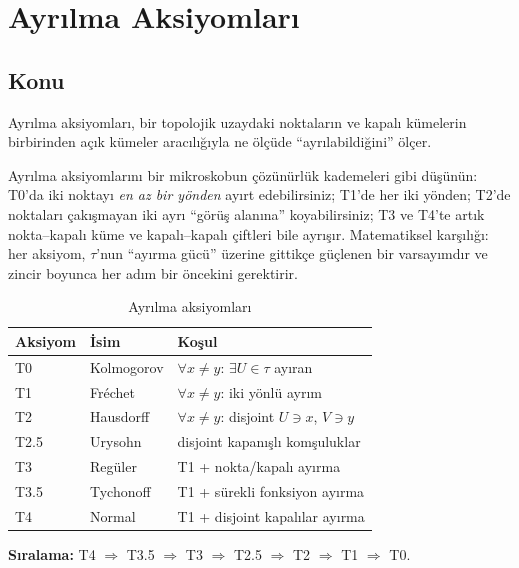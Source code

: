 \chapter{Ayrılma Aksiyomları}
\label{ch:separation}

\section{Konu}

Ayrılma aksiyomları, bir topolojik uzaydaki noktaların ve kapalı kümelerin birbirinden
açık kümeler aracılığıyla ne ölçüde ``ayrılabildiğini'' ölçer.

\begin{sezgi}
Ayrılma aksiyomlarını bir mikroskobun çözünürlük kademeleri gibi
düşünün: T0'da iki noktayı \emph{en az bir yönden} ayırt edebilirsiniz;
T1'de her iki yönden; T2'de noktaları çakışmayan iki ayrı ``görüş
alanına'' koyabilirsiniz; T3 ve T4'te artık nokta--kapalı küme ve
kapalı--kapalı çiftleri bile ayrışır. Matematiksel karşılığı: her
aksiyom, $\tau$'nun ``ayırma gücü'' üzerine gittikçe güçlenen bir
varsayımdır ve zincir boyunca her adım bir öncekini gerektirir.
\end{sezgi}

\begin{table}[h]
\centering
\begin{tabular}{lll}
\toprule
\textbf{Aksiyom} & \textbf{İsim} & \textbf{Koşul} \\
\midrule
T0 & Kolmogorov & $\forall x \neq y$: $\exists U \in \tau$ ayıran \\
T1 & Fréchet & $\forall x \neq y$: iki yönlü ayrım \\
T2 & Hausdorff & $\forall x \neq y$: disjoint $U \ni x$, $V \ni y$ \\
T2.5 & Urysohn & disjoint kapanışlı komşuluklar \\
T3 & Regüler & T1 + nokta/kapalı ayırma \\
T3.5 & Tychonoff & T1 + sürekli fonksiyon ayırma \\
T4 & Normal & T1 + disjoint kapalılar ayırma \\
\bottomrule
\end{tabular}
\caption{Ayrılma aksiyomları}
\end{table}

\noindent\textbf{Sıralama:} T4 $\Rightarrow$ T3.5 $\Rightarrow$ T3 $\Rightarrow$ T2.5
$\Rightarrow$ T2 $\Rightarrow$ T1 $\Rightarrow$ T0.

